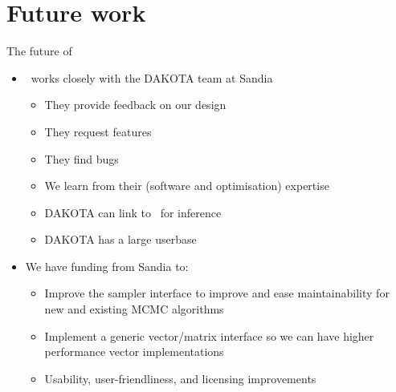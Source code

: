 \section{Future work}
\begin{frame}[fragile]{The future of \Queso}
  \begin{itemize}
    \item \Queso\ works closely with the DAKOTA team at Sandia
      \begin{itemize}
        \item They provide feedback on our design
        \item They request features
        \item They find bugs
        \item We learn from their (software and optimisation) expertise
        \item DAKOTA can link to \Queso\ for inference
        \item DAKOTA has a large userbase
      \end{itemize}
    \item We have funding from Sandia to:
      \begin{itemize}
        \item Improve the sampler interface to improve and ease maintainability
          for new and existing MCMC algorithms
        \item Implement a generic vector/matrix interface so we can have
          higher performance vector implementations
        \item Usability, user-friendliness, and licensing improvements
      \end{itemize}
  \end{itemize}
\end{frame}
